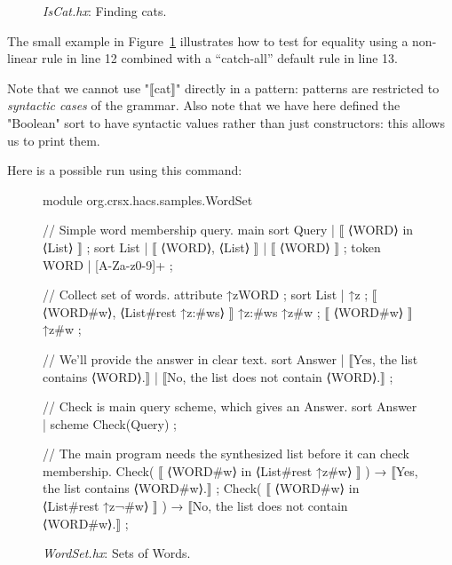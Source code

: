 \documentclass[11pt]{article} %
\begin{document}
\begin{figure}[t]
\caption{\emph{IsCat.hx}: Finding cats.}
\label{fig:cats}
\end{figure}

\begin{example}
  The small example in Figure~\ref{fig:cats} illustrates how to test for equality using a
  non-linear rule in line 12 combined with a ``catch-all'' default rule in line 13.

  Note that we cannot use "⟦cat⟧" directly in a pattern: patterns are restricted to \emph{syntactic
    cases} of the grammar.  Also note that we have here defined the "Boolean" sort to have syntactic
  values rather than just constructors: this allows us to print them.

  Here is a possible run using this command:
\end{example}

\begin{figure}[t]
\begin{hacs}[numbers=right,texcl]
module org.crsx.hacs.samples.WordSet {

// Simple word membership query.
main sort Query | ⟦ ⟨WORD⟩ in ⟨List⟩ ⟧ ;
sort List | ⟦ ⟨WORD⟩, ⟨List⟩ ⟧ | ⟦ ⟨WORD⟩ ⟧ ;
token WORD | [A-Za-z0-9]+ ;

// Collect set of words.
attribute ↑z{WORD} ;
sort List | ↑z ;
⟦ ⟨WORD#w⟩, ⟨List#rest ↑z{:#ws}⟩ ⟧ ↑z{:#ws} ↑z{#w} ;
⟦ ⟨WORD#w⟩ ⟧ ↑z{#w} ;

// We'll provide the answer in clear text.
sort Answer
| ⟦Yes, the list contains ⟨WORD⟩.⟧
| ⟦No, the list does not contain ⟨WORD⟩.⟧
;

// Check is main query scheme, which gives an Answer.
sort Answer | scheme Check(Query) ;

// The main program needs the synthesized list before it can check membership.
Check( ⟦ ⟨WORD#w⟩ in ⟨List#rest ↑z{#w}⟩ ⟧ ) → ⟦Yes, the list contains ⟨WORD#w⟩.⟧ ;
Check( ⟦ ⟨WORD#w⟩ in ⟨List#rest ↑z{¬#w}⟩ ⟧ ) → ⟦No, the list does not contain ⟨WORD#w⟩.⟧ ;
}
\end{hacs}
\caption{\emph{WordSet.hx}: Sets of Words.}
\label{fig:wordset}
\end{figure}
\end{document}
